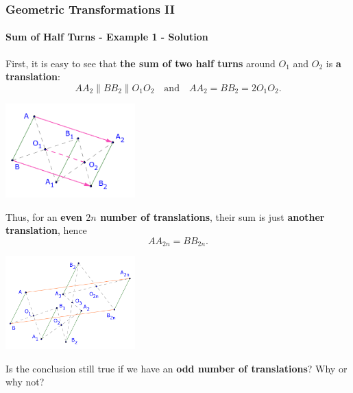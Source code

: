 \documentclass[8pt,xcolor=table,dvipsnames]{beamer}
\begin{document}
\begin{frame}[t]
    \frametitle{Geometric Transformations II}
    \framesubtitle{Sum of Half Turns - Example 1 - Solution}
    \begin{overprint}
        First, it is easy to see that \textbf{the sum of two half turns} around $O_1$ and $O_2$ is \textbf{a translation}:
        \[ 
            AA_2 \parallel BB_2 \parallel O_1O_2 \quad \text{and} \quad AA_2 = BB_2 = 2O_1O_2.
        \]
        \begin{center}
            \includegraphics[width=5cm]{./svg/pdf/translation-1b.pdf}
        \end{center}
        Thus, for an \textbf{even $2n$ number of translations}, their sum is just \textbf{another translation}, hence
        \[
            AA_{2n} = BB_{2n}.
        \]
        \begin{center}
            \includegraphics[width=5cm]{./svg/pdf/translation-1.pdf}
        \end{center}
    
        \bigbreak
        Is the conclusion still true if we have an \textbf{odd number of translations}? Why or why not?        
    \end{overprint}
\end{frame}
\end{document}
